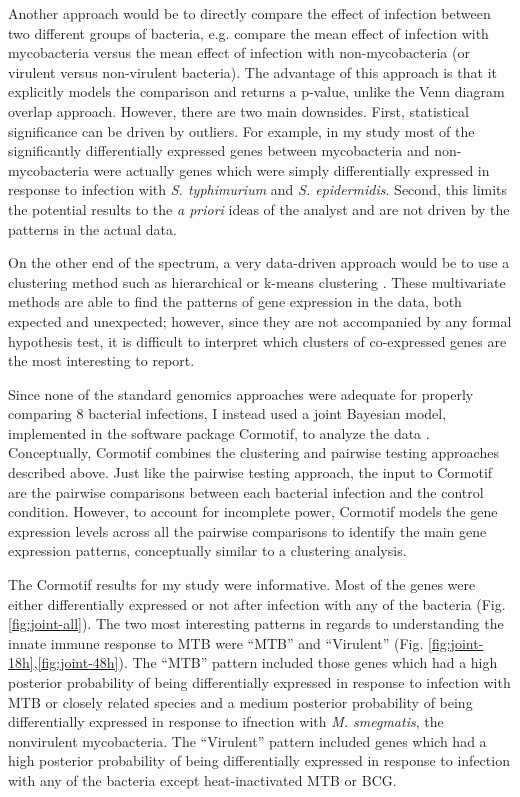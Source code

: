 Another approach would be to directly compare the effect of infection
between two different groups of bacteria, e.g. compare the mean effect
of infection with mycobacteria versus the mean effect of infection
with non-mycobacteria (or virulent versus non-virulent bacteria). The
advantage of this approach is that it explicitly models the comparison
and returns a p-value, unlike the Venn diagram overlap
approach. However, there are two main downsides. First, statistical
significance can be driven by outliers. For example, in my study most
of the significantly differentially expressed genes between
mycobacteria and non-mycobacteria were actually genes which were
simply differentially expressed in response to infection with
\emph{S. typhimurium} and \emph{S. epidermidis}. Second, this limits
the potential results to the \emph{a priori} ideas of the analyst and
are not driven by the patterns in the actual data.

On the other end of the spectrum, a very data-driven approach would be
to use a clustering method such as hierarchical or k-means clustering
\citep{Eisen1998, Michaels1998}. These multivariate methods are able
to find the patterns of gene expression in the data, both expected and
unexpected; however, since they are not accompanied by any formal
hypothesis test, it is difficult to interpret which clusters of
co-expressed genes are the most interesting to report.

Since none of the standard genomics approaches were adequate for
properly comparing 8 bacterial infections, I instead used a joint
Bayesian model, implemented in the software package Cormotif, to
analyze the data \citep{Wei2015}. Conceptually, Cormotif combines the
clustering and pairwise testing approaches described above. Just like
the pairwise testing approach, the input to Cormotif are the pairwise
comparisons between each bacterial infection and the control
condition. However, to account for incomplete power, Cormotif models
the gene expression levels across all the pairwise comparisons to
identify the main gene expression patterns, conceptually similar to a
clustering analysis.

The Cormotif results for my study were informative. Most of the genes
were either differentially expressed or not after infection with any
of the bacteria (Fig. \ref{fig:joint-all}). The two most interesting
patterns in regards to understanding the innate immune response to MTB
were ``MTB'' and ``Virulent''
(Fig. \ref{fig:joint-18h},\ref{fig:joint-48h}).  The ``MTB'' pattern
included those genes which had a high posterior probability of being
differentially expressed in response to infection with MTB or closely
related species and a medium posterior probability of being
differentially expressed in response to ifnection with
\emph{M. smegmatis}, the nonvirulent mycobacteria. The ``Virulent''
pattern included genes which had a high posterior probability of being
differentially expressed in response to infection with any of the
bacteria except heat-inactivated MTB or BCG.

